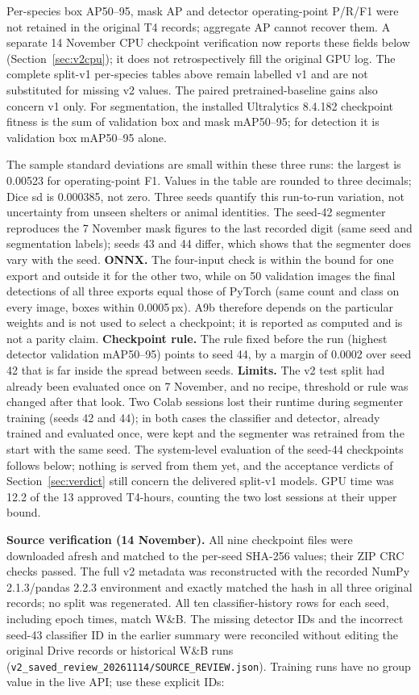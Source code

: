 \documentclass[11pt,a4paper]{article}
\begin{document}
Per-species box AP50--95, mask AP and detector operating-point P/R/F1 were not retained in the original T4 records; aggregate AP cannot recover them. A separate 14 November CPU checkpoint verification now reports these fields below (Section~\ref{sec:v2cpu}); it does not retrospectively fill the original GPU log. The complete split-v1 per-species tables above remain labelled v1 and are not substituted for missing v2 values. The paired pretrained-baseline gains also concern v1 only. For segmentation, the installed Ultralytics 8.4.182 checkpoint fitness is the sum of validation box and mask mAP50--95; for detection it is validation box mAP50--95 alone.

The sample standard deviations are small within these three runs: the largest is 0.00523 for operating-point F1. Values in the table are rounded to three decimals; Dice sd is 0.000385, not zero. Three seeds quantify this run-to-run variation, not uncertainty from unseen shelters or animal identities. The seed-42 segmenter reproduces the 7 November mask figures to the last recorded digit (same seed and segmentation labels); seeds 43 and 44 differ, which shows that the segmenter does vary with the seed. \textbf{ONNX.} The four-input check is within the bound for one export and outside it for the other two, while on 50 validation images the final detections of all three exports equal those of PyTorch (same count and class on every image, boxes within 0.0005\,px). A9b therefore depends on the particular weights and is not used to select a checkpoint; it is reported as computed and is not a parity claim. \textbf{Checkpoint rule.} The rule fixed before the run (highest detector validation mAP50--95) points to seed 44, by a margin of 0.0002 over seed 42 that is far inside the spread between seeds. \textbf{Limits.} The v2 test split had already been evaluated once on 7 November, and no recipe, threshold or rule was changed after that look. Two Colab sessions lost their runtime during segmenter training (seeds 42 and 44); in both cases the classifier and detector, already trained and evaluated once, were kept and the segmenter was retrained from the start with the same seed. The system-level evaluation of the seed-44 checkpoints follows below; nothing is served from them yet, and the acceptance verdicts of Section~\ref{sec:verdict} still concern the delivered split-v1 models. GPU time was 12.2 of the 13 approved T4-hours, counting the two lost sessions at their upper bound.

\textbf{Source verification (14 November).} All nine checkpoint files were downloaded afresh and matched to the per-seed SHA-256 values; their ZIP CRC checks passed. The full v2 metadata was reconstructed with the recorded NumPy 2.1.3/pandas 2.2.3 environment and exactly matched the hash in all three original records; no split was regenerated. All ten classifier-history rows for each seed, including epoch times, match W\&B. The missing detector IDs and the incorrect seed-43 classifier ID in the earlier summary were reconciled without editing the original Drive records or historical W\&B runs (\texttt{v2\_saved\_review\_20261114/SOURCE\_REVIEW.json}). Training runs have no group value in the live API; use these explicit IDs:
\end{document}
